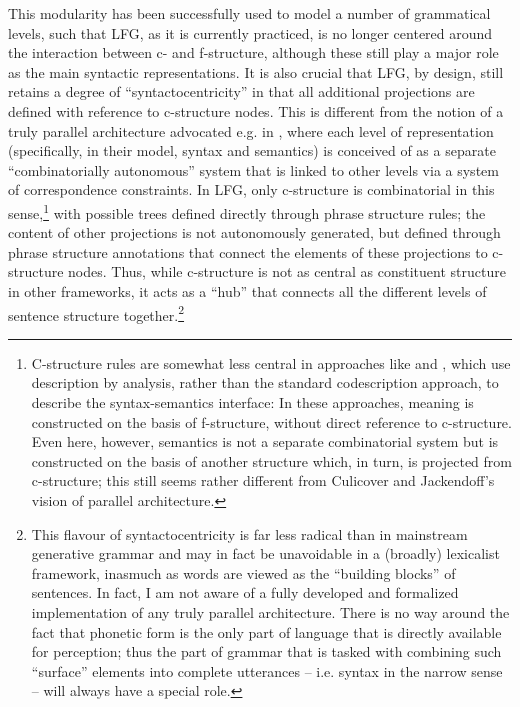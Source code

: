 \documentclass[output=paper]{langscibook}
\begin{document}
 This modularity has been successfully used to model a number of grammatical levels, such that LFG, as it is currently practiced, is no longer centered around the interaction between c- and f-structure, although these still play a major role as the main syntactic representations. It is also crucial that LFG, by design, still retains a degree of ``syntactocentricity'' in that all additional projections are defined with reference to c-structure nodes. This is different from the notion of a truly parallel architecture advocated e.g. in \textcite{culicover2005simpler}, where each level of representation (specifically, in their model, syntax and semantics) is conceived of as a separate ``combinatorially autonomous'' system that is linked to other levels via a system of correspondence constraints. In LFG, only c-structure is combinatorial in this sense,\footnote{C-structure rules are somewhat less central in approaches like \textcite{halvorsen83} and \textcite{andrews2008}, which use description by analysis, rather than the standard codescription approach, to describe the syntax-semantics interface: In these approaches, meaning is constructed on the basis of f-structure, without direct reference to c-structure. Even here, however, semantics is not a separate combinatorial system but is constructed on the basis of another structure which, in turn, is projected from c-structure; this still seems rather different from Culicover and Jackendoff's vision of parallel architecture.} with possible trees defined directly through phrase structure rules; the content of other projections is not autonomously generated, but defined through phrase structure annotations that connect the elements of these projections to c-structure nodes. Thus, while c-structure is not as central as constituent structure in other frameworks, it acts as a ``hub'' that connects all the different levels of sentence structure together.\footnote{This flavour of syntactocentricity is far less radical than in mainstream generative grammar and may in fact be unavoidable in a (broadly) lexicalist framework, inasmuch as words are viewed as the ``building blocks'' of sentences. In fact, I am not aware of a fully developed and formalized implementation of any truly parallel architecture. There is no way around the fact that phonetic form is the only part of language that is directly available for perception; thus the part of grammar that is tasked with combining such ``surface'' elements into complete utterances -- i.e. syntax in the narrow sense -- will always have a special role.}
 
\end{document}
